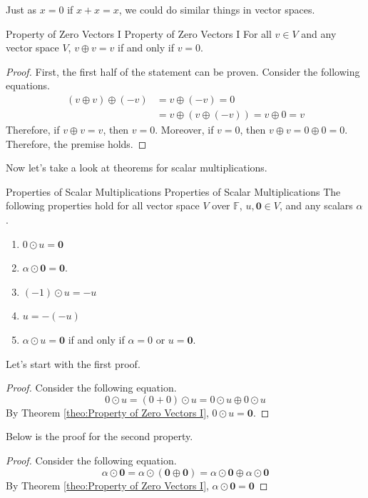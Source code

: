 \documentclass[../main.tex]{subfiles}
\begin{document}
Just as $x = 0$ if $x + x = x$, we could do similar things in vector
spaces.

\begin{theorem}{Property of Zero Vectors I}
{Property of Zero Vectors I}
For all $v \in V$ and any vector space $V$, $v \oplus v = v$ if and
only if $v = 0$.
\end{theorem}
\begin{proof}
First, the first half of the statement can be proven. Consider the
following equations.
\begin{align*}
    (v \oplus v) \oplus (-v)
    &= v \oplus (-v) = 0 \\
    &= v \oplus (v \oplus (-v)) = v \oplus 0 = v
\end{align*}
Therefore, if $v \oplus v = v$, then $v = 0$. Moreover, if $v = 0$,
then $v \oplus v = 0 \oplus 0 = 0$. Therefore, the premise holds.
\end{proof}

Now let's take a look at theorems for scalar multiplications.

\begin{theorem}{Properties of Scalar Multiplications}
{Properties of Scalar Multiplications}
The following properties hold for all vector space $V$ over
$\mathbb{F}$, $u, \mathbf{0} \in V$, and any scalars $\alpha$.
\begin{enumerate}[noitemsep]
\item $0 \odot u = \mathbf{0}$
\item $\alpha \odot \mathbf{0} = \mathbf{0}$.
\item $(-1) \odot u = -u$
\item $u = -(-u)$
\item $\alpha \odot u = \mathbf{0}$ if and only if $\alpha = 0$ or
$u = \mathbf{0}$.
\end{enumerate}
\end{theorem}

Let's start with the first proof.

\begin{proof}
Consider the following equation.
\[
0 \odot u
= (0 + 0) \odot u
= 0 \odot u \oplus 0 \odot u
\]
By Theorem \ref{theo:Property of Zero Vectors I}, $0 \odot u =
\mathbf{0}$.
\end{proof}

Below is the proof for the second property.

\begin{proof}
Consider the following equation.
\[
\alpha \odot \mathbf{0}
= \alpha \odot (\mathbf{0} \oplus \mathbf{0})
= \alpha \odot \mathbf{0} \oplus \alpha \odot \mathbf{0}
\]
By Theorem \ref{theo:Property of Zero Vectors I}, $\alpha \odot
\mathbf{0} = \mathbf{0}$
\end{proof}
\end{document}
